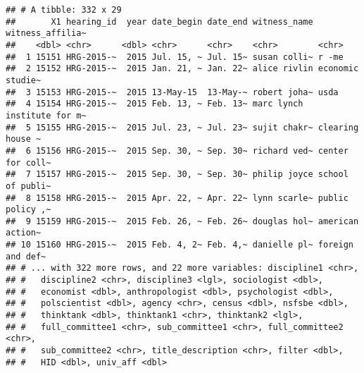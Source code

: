\documentclass[]{article}
\newenvironment{Shaded}{\begin{snugshade}}{\end{snugshade}}
\newcommand{\DataTypeTok}[1]{\textcolor[rgb]{0.13,0.29,0.53}{#1}}
\newcommand{\DecValTok}[1]{\textcolor[rgb]{0.00,0.00,0.81}{#1}}
\newcommand{\KeywordTok}[1]{\textcolor[rgb]{0.13,0.29,0.53}{\textbf{#1}}}
\newcommand{\NormalTok}[1]{#1}
\newcommand{\OperatorTok}[1]{\textcolor[rgb]{0.81,0.36,0.00}{\textbf{#1}}}
\newcommand{\StringTok}[1]{\textcolor[rgb]{0.31,0.60,0.02}{#1}}
\begin{document}
\begin{verbatim}
## # A tibble: 332 x 29
##       X1 hearing_id  year date_begin date_end witness_name witness_affilia~
##    <dbl> <chr>      <dbl> <chr>      <chr>    <chr>        <chr>           
##  1 15151 HRG-2015-~  2015 Jul. 15, ~ Jul. 15~ susan colli~ r -me           
##  2 15152 HRG-2015-~  2015 Jan. 21, ~ Jan. 22~ alice rivlin economic studie~
##  3 15153 HRG-2015-~  2015 13-May-15  13-May-~ robert joha~ usda            
##  4 15154 HRG-2015-~  2015 Feb. 13, ~ Feb. 13~ marc lynch   institute for m~
##  5 15155 HRG-2015-~  2015 Jul. 23, ~ Jul. 23~ sujit chakr~ clearing house ~
##  6 15156 HRG-2015-~  2015 Sep. 30, ~ Sep. 30~ richard ved~ center for coll~
##  7 15157 HRG-2015-~  2015 Sep. 30, ~ Sep. 30~ philip joyce school of publi~
##  8 15158 HRG-2015-~  2015 Apr. 22, ~ Apr. 22~ lynn scarle~ public policy ,~
##  9 15159 HRG-2015-~  2015 Feb. 26, ~ Feb. 26~ douglas hol~ american action~
## 10 15160 HRG-2015-~  2015 Feb. 4, 2~ Feb. 4,~ danielle pl~ foreign and def~
## # ... with 322 more rows, and 22 more variables: discipline1 <chr>,
## #   discipline2 <chr>, discipline3 <lgl>, sociologist <dbl>,
## #   economist <dbl>, anthropologist <dbl>, psychologist <dbl>,
## #   polscientist <dbl>, agency <chr>, census <dbl>, nsfsbe <dbl>,
## #   thinktank <dbl>, thinktank1 <chr>, thinktank2 <lgl>,
## #   full_committee1 <chr>, sub_committee1 <chr>, full_committee2 <chr>,
## #   sub_committee2 <chr>, title_description <chr>, filter <dbl>,
## #   HID <dbl>, univ_aff <dbl>
\end{verbatim}

\begin{Shaded}
\end{Shaded}
\end{document}
